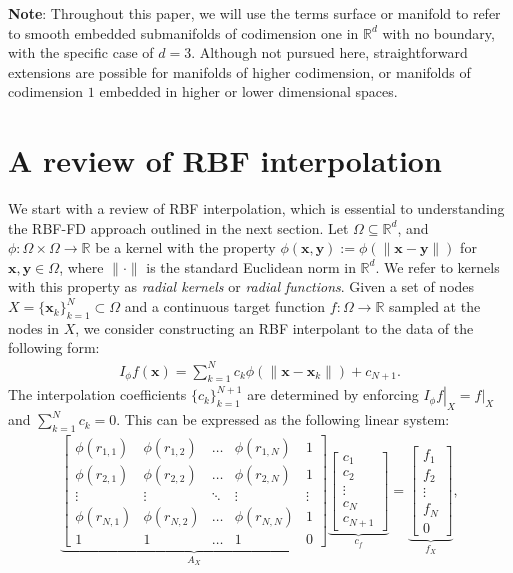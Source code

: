 \documentclass[smallextended]{svjour3}
\newcommand{\vX}{ \mathbf{x} }
\newcommand{\vY}{ \mathbf{y} }
\newcommand{\lf}{\left}
\newcommand{\rt}{\right}
\begin{document}
\textbf{Note}: Throughout this paper, we will use the terms surface or manifold to refer to smooth embedded submanifolds of codimension one in $\mathbb{R}^d$ with no boundary, with the specific case of $d = 3$. Although not pursued here, straightforward extensions are possible for manifolds of higher codimension, or manifolds of codimension $1$ embedded in higher or lower dimensional spaces.



\section{A review of RBF interpolation}
\label{sec:rbf_review}

We start with a review of RBF interpolation, which is essential to understanding the RBF-FD approach outlined in the next section. Let $\Omega \subseteq \mathbb{R}^d$, and $\phi :\Omega \times\Omega \to \mathbb{R}$ be a kernel with the property $\phi(\vX,\vY) := \phi(\|\vX-\vY\|)$ for $\vX,\vY\in\Omega$, where $\|\cdot\|$ is the standard Euclidean norm in $\mathbb{R}^d$.  We refer to kernels with this property as \emph{radial kernels} or \emph{radial functions}. Given a set of nodes $X = \{\vX_k\}_{k = 1}^N \subset \Omega$ and a continuous target function $f:\Omega \to \mathbb{R}$ sampled at the nodes in $X$, we consider constructing an RBF interpolant to the data of the following form:
%
\begin{align}
I_{\phi} f(\vX) = \sum_{k=1}^N c_k \phi(\|\vX - \vX_k\|) + c_{N+1}.
\label{eq:srbfinterp}
\end{align}
%
The interpolation coefficients $\{c_k\}_{k=1}^{N+1}$ are determined by enforcing $\lf.I_{\phi} f\rt|_{X} = \lf.f\rt|_{X}$ and $\sum_{k=1}^{N} c_k = 0$. This can be expressed as the following linear system:
%
\begin{align}
\underbrace{
\begin{bmatrix}
\phi(r_{1,1}) & \phi(r_{1,2}) & \hdots & \phi(r_{1,N}) & 1 \\
\phi(r_{2,1}) & \phi(r_{2,2}) & \hdots & \phi(r_{2,N}) & 1\\
\vdots & \vdots & \ddots & \vdots & \vdots\\
\phi(r_{N,1}) & \phi(r_{N,2}) & \hdots & \phi(r_{N,N}) & 1\\
1 & 1 & \hdots & 1 & 0
\end{bmatrix}}_{A_X}
\underbrace{
\begin{bmatrix}
c_1 \\
c_2 \\
\vdots \\
c_N \\
c_{N+1}
\end{bmatrix}}_{c_f}
=
\underbrace{
\begin{bmatrix}
f_1 \\
f_2 \\
\vdots \\
f_N\\
0
\end{bmatrix}}_{f_X},
\label{eq:rbf_linsys}
\end{align}
\end{document}
